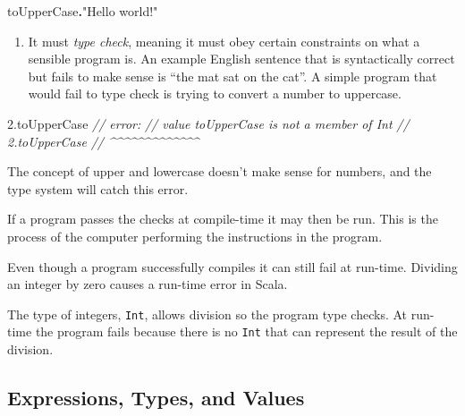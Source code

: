 \documentclass[11pt,a5paper,]{book}
\newenvironment{Shaded}{\begin{snugshade}}{\end{snugshade}}
\newcommand{\CommentTok}[1]{\textcolor[rgb]{0.56,0.35,0.01}{\textit{#1}}}
\newcommand{\DecValTok}[1]{\textcolor[rgb]{0.00,0.00,0.81}{#1}}
\newcommand{\FloatTok}[1]{\textcolor[rgb]{0.00,0.00,0.81}{#1}}
\newcommand{\NormalTok}[1]{#1}
\newcommand{\OperatorTok}[1]{\textcolor[rgb]{0.81,0.36,0.00}{\textbf{#1}}}
\newcommand{\StringTok}[1]{\textcolor[rgb]{0.31,0.60,0.02}{#1}}
\providecommand{\tightlist}{%
  \setlength{\itemsep}{0pt}\setlength{\parskip}{0pt}}
\begin{document}
\begin{Shaded}
\begin{Highlighting}[]
\NormalTok{toUpperCase}\OperatorTok{.}\StringTok{"Hello world!"}
\end{Highlighting}
\end{Shaded}

\begin{enumerate}
\def\labelenumi{\arabic{enumi}.}
\setcounter{enumi}{1}
\tightlist
\item
  It must \emph{type check}, meaning it must obey certain constraints on
  what a sensible program is. An example English sentence that is
  syntactically correct but fails to make sense is ``the mat sat on the
  cat''. A simple program that would fail to type check is trying to
  convert a number to uppercase.
\end{enumerate}

\begin{Shaded}
\begin{Highlighting}[]
\FloatTok{2.}\NormalTok{toUpperCase}
\CommentTok{// error:}
\CommentTok{// value toUpperCase is not a member of Int}
\CommentTok{// 2.toUpperCase}
\CommentTok{// \^{}\^{}\^{}\^{}\^{}\^{}\^{}\^{}\^{}\^{}\^{}\^{}\^{}}
\end{Highlighting}
\end{Shaded}

The concept of upper and lowercase doesn't make sense for numbers, and
the type system will catch this error.

If a program passes the checks at compile-time it may then be run. This
is the process of the computer performing the instructions in the
program.

Even though a program successfully compiles it can still fail at
run-time. Dividing an integer by zero causes a run-time error in Scala.

\begin{Shaded}
\end{Shaded}

The type of integers, \texttt{Int}, allows division so the program type
checks. At run-time the program fails because there is no \texttt{Int}
that can represent the result of the division.

\hypertarget{expressions-types-and-values-1}{%
\subsection{Expressions, Types, and
Values}\label{expressions-types-and-values-1}}
\end{document}
